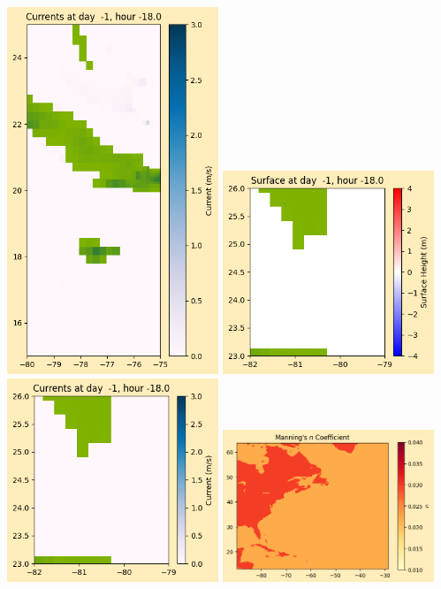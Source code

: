 \documentclass[11pt]{article}
\begin{document}
\includegraphics[width=0.475\textwidth]{frame0005fig1008.png}
\vskip 10pt 
\includegraphics[width=0.475\textwidth]{frame0005fig1009.png}
\includegraphics[width=0.475\textwidth]{frame0005fig1010.png}
\vskip 10pt 
\includegraphics[width=0.475\textwidth]{frame0005fig1011.png}
\end{document}

